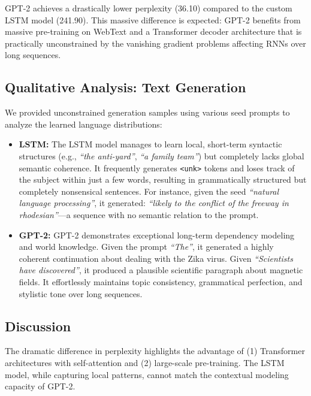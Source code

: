 \documentclass[12pt, a4paper]{article}
\begin{document}
GPT-2 achieves a drastically lower perplexity (36.10) compared to the custom LSTM model (241.90). This massive difference is expected: GPT-2 benefits from massive pre-training on WebText and a Transformer decoder architecture that is practically unconstrained by the vanishing gradient problems affecting RNNs over long sequences.

\subsection{Qualitative Analysis: Text Generation}

We provided unconstrained generation samples using various seed prompts to analyze the learned language distributions:
\begin{itemize}
    \item \textbf{LSTM:} The LSTM model manages to learn local, short-term syntactic structures (e.g., \textit{``the anti-yard''},  \textit{``a family team''}) but completely lacks global semantic coherence. It frequently generates \texttt{<unk>} tokens and loses track of the subject within just a few words, resulting in grammatically structured but completely nonsensical sentences. For instance, given the seed \textit{``natural language processing''}, it generated: \textit{``likely to the conflict of the freeway in rhodesian''}---a sequence with no semantic relation to the prompt.
    \item \textbf{GPT-2:} GPT-2 demonstrates exceptional long-term dependency modeling and world knowledge. Given the prompt \textit{``The''}, it generated a highly coherent continuation about dealing with the Zika virus. Given \textit{``Scientists have discovered''}, it produced a plausible scientific paragraph about magnetic fields. It effortlessly maintains topic consistency, grammatical perfection, and stylistic tone over long sequences.
\end{itemize}

\subsection{Discussion}

The dramatic difference in perplexity highlights the advantage of (1) Transformer architectures with self-attention and (2) large-scale pre-training. The LSTM model, while capturing local patterns, cannot match the contextual modeling capacity of GPT-2.

\end{document}
